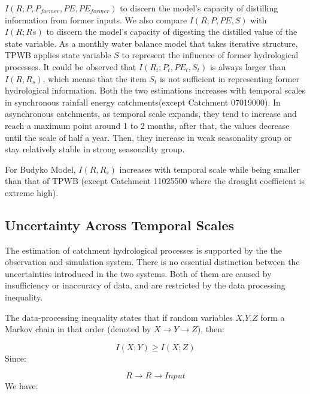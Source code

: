\documentclass[draft,wrr]{AGUTeX}
\begin{document}
\begin{article}
$I(R;P,P_{former},PE,PE_{former})$ to discern the model's capacity of distilling information from former inputs. We also compare $I(R;P,PE,S)$ with $I(R;Rs)$ to discern the model's capacity of digesting the distilled value of the state variable.
 As a monthly water balance model that takes  iterative structure, TPWB applies state variable $S$ to represent the influence of former hydrological processes. It could be observed that $I(R_t;P_t,PE_t,S_t)$ is always larger than $I(R,R_s)$, which means that the item $S_t$ is not sufficient in representing former hydrological information. Both the two estimations increases with temporal scales in synchronous rainfall energy catchments(except Catchment 07019000). In asynchronous catchments, as temporal scale expands, they tend to increase and reach a maximum point  around 1 to 2 months, after that, the values decrease until the scale of half a year. Then, they increase in weak seasonality group or stay relatively stable in strong seasonality group.
\fi

For Budyko Model, $I(R,R_s)$ increases  with temporal scale while being smaller than that of TPWB (except Catchment 11025500 where the drought coefficient is extreme high). 


\subsection{Uncertainty Across Temporal Scales}
The estimation of catchment hydrological processes is supported by the   the observation and simulation system. There is no essential distinction between the uncertainties introduced in the two systems. Both of them are caused by insufficiency or inaccuracy of data, and are restricted by the data processing inequality\citep{cover2012elements}.

The data-processing inequality states that if random variables $X$,$Y$,$Z$ form a Markov chain in that order (denoted by $X \rightarrow Y \rightarrow Z$), then:

\begin{equation}
I(X;Y) \geq I(X;Z)
\end{equation}
\iffalse
Since:

\begin{equation}
R \rightarrow R \rightarrow Input
\end{equation}
We have:


\end{article}
\end{document}
